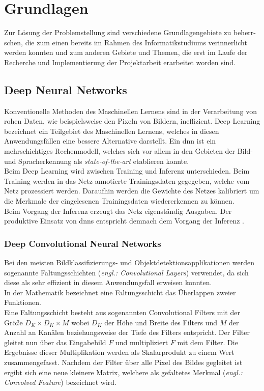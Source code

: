 \documentclass[oneside]{ausarbeitung}
\begin{document}
\chapter{Grundlagen}
\label{cha:grundlagen}
Zur Lösung der Problemstellung sind verschiedene Grundlagengebiete zu beherr-
schen, die zum einen bereits im Rahmen des Informatikstudiums verinnerlicht werden konnten und zum anderen Gebiete und Themen, die erst im Laufe der Recherche und Implementierung der Projektarbeit erarbeitet worden sind.
\section{Deep Neural Networks}
Konventionelle Methoden des Maschinellen Lernens sind in der Verarbeitung von rohen Daten, wie beispielsweise den Pixeln von Bildern, ineffizient.
Deep Learning bezeichnet ein Teilgebiet des Maschinellen Lernens, welches in diesen Anwendungsfällen eine bessere Alternative darstellt. Ein \ac{dnn} ist ein mehrschichtiges Rechenmodell, welches sich vor allem in den Gebieten der Bild- und Spracherkennung als \textit{state-of-the-art} etablieren konnte.\\
Beim Deep Learning wird zwischen Training und Inferenz unterschieden. Beim Training werden in das Netz annotierte Trainingsdaten gegegeben, welche vom Netz prozessiert werden. Daraufhin werden die Gewichte des Netzes kalibriert um die Merkmale der eingelesenen Trainingsdaten wiedererkennen zu können.\\
Beim Vorgang der Inferenz erzeugt das Netz eigenständig Ausgaben. Der produktive Einsatz von \acp{dnn} entspricht demnach dem Vorgang der Inferenz \cite{deepl-vs-traditional, deepl-lecun}. 
\subsection{Deep Convolutional Neural Networks}
Bei den meisten Bildklassifizierungs- und Objektdetektionsapplikationen werden sogenannte Faltungsschichten (\textit{engl.: Convolutional Layers}) verwendet, da sich diese als sehr effizient in diesem Anwendungsfall erweisen konnten.\\
In der Mathematik bezeichnet eine Faltungsschicht das Überlappen zweier Funktionen.\\
Eine Faltungsschicht besteht aus sogenannten Convolutional Filters mit der Größe $D_K \times D_K \times M$ wobei $D_K$ der Höhe und Breite des Filters und $M$ der Anzahl an Kanälen beziehungsweise der Tiefe des Filters entspricht. Der Filter gleitet nun über das Eingabebild $F$ und multipliziert $F$ mit dem Filter. Die Ergebnisse dieser Multiplikation werden als Skalarprodukt zu einem Wert zusammengefasst. Nachdem der Filter über alle Pixel des Bildes gegleitet ist ergibt sich eine neue kleinere Matrix, welchere als gefaltetes Merkmal (\textit{engl.: Convolved Feature}) bezeichnet wird.
\end{document}
